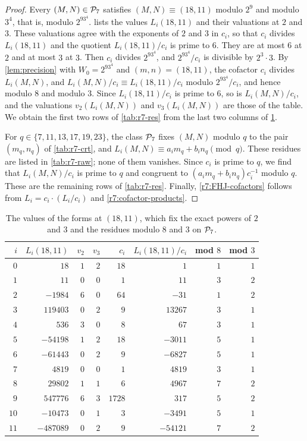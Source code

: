 \begin{proof}
Every $(M,N)\in\mathcal P_7$ satisfies $(M,N)\equiv(18,11)$ modulo $2^9$ and
modulo $3^4$, that is, modulo $2^93^4$.  lists the
values $L_i(18,11)$ and their valuations at $2$ and $3$. These valuations
agree with the exponents of $2$ and $3$ in $c_i$, so that $c_i$ divides
$L_i(18,11)$ and the quotient $L_i(18,11)/c_i$ is prime to $6$. They are at
most $6$ at $2$ and at most $3$ at $3$. Then $c_i$ divides $2^93^4$, and
$2^93^4/c_i$ is divisible by $2^3\cdot3$. By \cref{lem:precision} with
$W_0=2^93^4$ and $(m,n)=(18,11)$, the cofactor $c_i$ divides $L_i(M,N)$,
and $L_i(M,N)/c_i\equiv L_i(18,11)/c_i$ modulo $2^93^4/c_i$, and hence
modulo $8$ and modulo $3$. Since $L_i(18,11)/c_i$ is prime to $6$, so is $L_i(M,N)/c_i$, and the valuations $v_2(L_i(M,N))$ and $v_3(L_i(M,N))$ are
those of the table. We obtain the first two rows of \cref{tab:r7-res} from
the last two columns of \cref{tab:r7-anchor}.

For $q\in\{7,11,13,17,19,23\}$, the class $\mathcal P_7$ fixes $(M,N)$ modulo $q$
to the pair $(m_q,n_q)$ of \cref{tab:r7-crt}, and
$L_i(M,N)\equiv a_im_q+b_in_q\pmod q$. These residues are listed in
\cref{tab:r7-raw}; none of them vanishes. Since $c_i$ is prime to $q$, we
find that $L_i(M,N)/c_i$ is prime to $q$ and congruent to
$(a_im_q+b_in_q)c_i^{-1}$ modulo $q$. These are the remaining rows of
\cref{tab:r7-res}. Finally, \eqref{r7:FHJ-cofactors} follows from
$L_i=c_i\cdot(L_i/c_i)$ and \eqref{r7:cofactor-products}.
\end{proof}

\begin{table}[htbp]
\centering
\caption{The values of the forms at $(18,11)$, which fix the exact powers of
$2$ and $3$ and the residues modulo $8$ and $3$ on $\mathcal P_7$.}
\label{tab:r7-anchor}
\small
\begin{tabular}{rrrrrrrr}
\toprule
$i$ & $L_i(18,11)$ & $v_2$ & $v_3$ & $c_i$ & $L_i(18,11)/c_i$ & mod $8$ & mod $3$\\
\midrule
$0$ & $18$ & $1$ & $2$ & $18$ & $1$ & $1$ & $1$ \\
$1$ & $11$ & $0$ & $0$ & $1$ & $11$ & $3$ & $2$ \\
$2$ & $-1984$ & $6$ & $0$ & $64$ & $-31$ & $1$ & $2$ \\
$3$ & $119403$ & $0$ & $2$ & $9$ & $13267$ & $3$ & $1$ \\
$4$ & $536$ & $3$ & $0$ & $8$ & $67$ & $3$ & $1$ \\
$5$ & $-54198$ & $1$ & $2$ & $18$ & $-3011$ & $5$ & $1$ \\
$6$ & $-61443$ & $0$ & $2$ & $9$ & $-6827$ & $5$ & $1$ \\
$7$ & $4819$ & $0$ & $0$ & $1$ & $4819$ & $3$ & $1$ \\
$8$ & $29802$ & $1$ & $1$ & $6$ & $4967$ & $7$ & $2$ \\
$9$ & $547776$ & $6$ & $3$ & $1728$ & $317$ & $5$ & $2$ \\
$10$ & $-10473$ & $0$ & $1$ & $3$ & $-3491$ & $5$ & $1$ \\
$11$ & $-487089$ & $0$ & $2$ & $9$ & $-54121$ & $7$ & $2$ \\
\bottomrule
\end{tabular}
\end{table}

